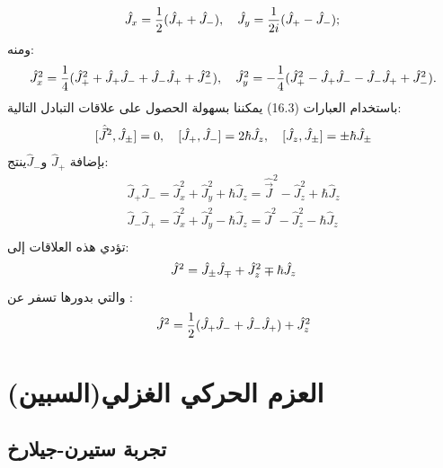 \begin{equation}
	 \hat{J}_x=\frac{1}{2}(\hat{J}_{+}+\hat{J}_{-}), \quad \hat{J}_y=\frac{1}{2 i}(\hat{J}_{+}-\hat{J}_{-}) ; \\
\end{equation}
ومنه:
\begin{equation}
 \hat{J}_x^2=\frac{1}{4}(\hat{J}_{+}^2+\hat{J}_{+} \hat{J}_{-}+\hat{J}_{-} \hat{J}_{+}+\hat{J}_{-}^2), \quad \hat{J}_y^2=-\frac{1}{4}(\hat{J}_{+}^2-\hat{J}_{+} \hat{J}_{-}-\hat{J}_{-} \hat{J}_{+}+\hat{J}_{-}^2) . \\
\end{equation}
باستخدام العبارات (16.3) يمكننا بسهولة الحصول على علاقات التبادل التالية:
\begin{equation}
	 {[\hat{\vec{J}}^2, \hat{J}_{ \pm}]=0, \quad[\hat{J}_{+}, \hat{J}_{-}]=2 \hbar \hat{J}_z, \quad[\hat{J}_z, \hat{J}_{ \pm}]= \pm \hbar \hat{J}_{ \pm} } \\
\end{equation}
بإضافة $\hat{J}_{+}$ و$ \hat{J}_{-}$ينتج:
\begin{equation}
	\begin{aligned}
		 \hat{J}_{+} \hat{J}_{-}=\hat{J}_x^2+\hat{J}_y^2+\hbar \hat{J}_z=\hat{\vec{J}}^2-\hat{J}_z^2+\hbar \hat{J}_z\\
		 \hat{J}_{-} \hat{J}_{+}=\hat{J}_x^2+\hat{J}_y^2-\hbar \hat{J}_z=\hat{J}^2-\hat{J}_z^2-\hbar \hat{J}_z \\
	\end{aligned}
\end{equation}
تؤدي هذه العلاقات إلى:
\begin{equation}
	 \hat{J}^2=\hat{J}_{ \pm} \hat{J}_{\mp}+\hat{J}_z^2 \mp \hbar \hat{J}_z \\
\end{equation}
والتي بدورها تسفر عن :
\begin{equation}
	\hat{J}^2=\frac{1}{2}(\hat{J}_{+} \hat{J}_{-}+\hat{J}_{-} \hat{J}_{+})+\hat{J}_z^2  \\
\end{equation}

\section{العزم الحركي الغزلي(السبين)}

\subsection{تجربة ستيرن-جيلارخ}

